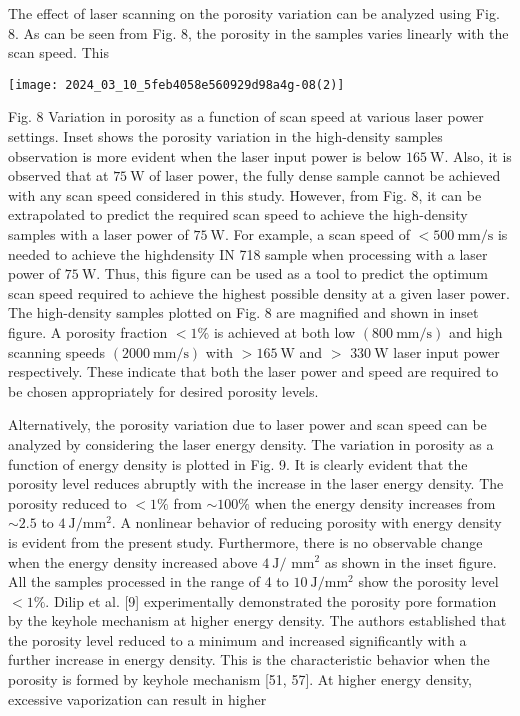 \documentclass[10pt]{article}
\begin{document}
The effect of laser scanning on the porosity variation can be analyzed using Fig. 8. As can be seen from Fig. 8, the porosity in the samples varies linearly with the scan speed. This

\begin{center}
\texttt{[image: 2024\_03\_10\_5feb4058e560929d98a4g-08(2)]}
\end{center}

Fig. 8 Variation in porosity as a function of scan speed at various laser power settings. Inset shows the porosity variation in the high-density samples observation is more evident when the laser input power is below $165 \mathrm{~W}$. Also, it is observed that at $75 \mathrm{~W}$ of laser power, the fully dense sample cannot be achieved with any scan speed considered in this study. However, from Fig. 8, it can be extrapolated to predict the required scan speed to achieve the high-density samples with a laser power of $75 \mathrm{~W}$. For example, a scan speed of $<500 \mathrm{~mm} / \mathrm{s}$ is needed to achieve the highdensity IN 718 sample when processing with a laser power of $75 \mathrm{~W}$. Thus, this figure can be used as a tool to predict the optimum scan speed required to achieve the highest possible density at a given laser power. The high-density samples plotted on Fig. 8 are magnified and shown in inset figure. A porosity fraction $<1 \%$ is achieved at both low $(800 \mathrm{~mm} / \mathrm{s})$ and high scanning speeds $(2000 \mathrm{~mm} / \mathrm{s})$ with $>165 \mathrm{~W}$ and $>$ $330 \mathrm{~W}$ laser input power respectively. These indicate that both the laser power and speed are required to be chosen appropriately for desired porosity levels.

Alternatively, the porosity variation due to laser power and scan speed can be analyzed by considering the laser energy density. The variation in porosity as a function of energy density is plotted in Fig. 9. It is clearly evident that the porosity level reduces abruptly with the increase in the laser energy density. The porosity reduced to $<1 \%$ from $\sim 100 \%$ when the energy density increases from $\sim 2.5$ to $4 \mathrm{~J} / \mathrm{mm}^{2}$. A nonlinear behavior of reducing porosity with energy density is evident from the present study. Furthermore, there is no observable change when the energy density increased above $4 \mathrm{~J} /$ $\mathrm{mm}^{2}$ as shown in the inset figure. All the samples processed in the range of 4 to $10 \mathrm{~J} / \mathrm{mm}^{2}$ show the porosity level $<1 \%$. Dilip et al. [9] experimentally demonstrated the porosity pore formation by the keyhole mechanism at higher energy density. The authors established that the porosity level reduced to a minimum and increased significantly with a further increase in energy density. This is the characteristic behavior when the porosity is formed by keyhole mechanism [51, 57]. At higher energy density, excessive vaporization can result in higher
\end{document}
